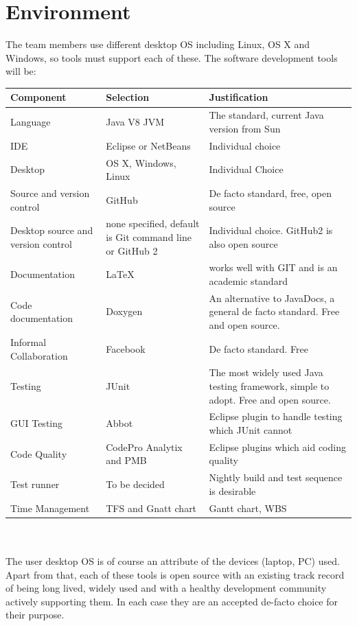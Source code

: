 \documentclass[a4paper,10pt]{article}
\begin{document}
\section{Environment}


The team members use different desktop OS including Linux, OS X and Windows, so tools must support each of these. The software development tools will be:    \\

\setlength\extrarowheight{5pt}
\begin{tabular}{ || p{35mm}|p{40mm}|p{85mm} ||}

\hline
\textbf{Component} & \textbf{Selection} & \textbf{Justification} \\
\hline

 Language & Java V8 JVM &  The standard, current Java version from Sun  \\
IDE & Eclipse or NetBeans & Individual choice\\
Desktop & OS X, Windows, Linux & Individual Choice\\
Source and version control & GitHub & De facto standard, free, open source\\
Desktop source and version control & none specified, default is Git command line or GitHub 2 & Individual choice. GitHub2 is also open source\\
Documentation & LaTeX & works well with GIT and is an academic standard\\
Code documentation  &  Doxygen & An alternative to JavaDocs, a general de facto standard. Free and open source.  \\
Informal Collaboration & Facebook & De facto standard. Free\\
Testing & JUnit & The most widely used Java testing framework, simple to adopt. Free and open source. \\
GUI Testing & Abbot & Eclipse plugin to handle testing which JUnit cannot\\
Code Quality & CodePro Analytix and PMB & Eclipse plugins which aid coding quality\\
Test runner & To be decided & Nightly build and test sequence is desirable\\
Time Management & TFS and Gnatt chart & Gantt chart, WBS\\
 \hline
\end{tabular}
\\
\\
The user desktop OS is of course an attribute of the devices (laptop, PC) used. Apart from that, each of these tools is open source with an existing track record of being long lived, widely used and with a healthy development community actively supporting them. In each case they are an accepted de-facto choice for their purpose.
\end{document}
